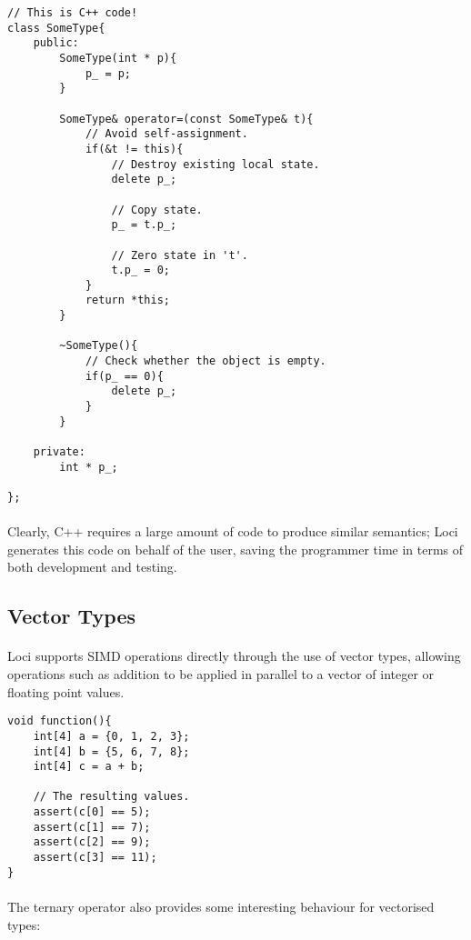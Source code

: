 \documentclass[12pt,twoside,notitlepage]{report}
\begin{document}
\small{
\begin{verbatim}
// This is C++ code!
class SomeType{
    public:
        SomeType(int * p){
            p_ = p;
        }
        
        SomeType& operator=(const SomeType& t){
            // Avoid self-assignment.
            if(&t != this){
                // Destroy existing local state.
                delete p_;
                
                // Copy state.
                p_ = t.p_;
                
                // Zero state in 't'.
                t.p_ = 0;
            }
            return *this;
        }
        
        ~SomeType(){
            // Check whether the object is empty.
            if(p_ == 0){
                delete p_;
            }
        }
    
    private:
        int * p_;
    
};
\end{verbatim}
}

\paragraph{}
Clearly, C++ requires a large amount of code to produce similar semantics; Loci generates this code on behalf of the user, saving the programmer time in terms of both development and testing.

\subsection{Vector Types}

\paragraph{}
Loci supports SIMD operations directly through the use of vector types, allowing operations such as addition to be applied in parallel to a vector of integer or floating point values.

\small{
\begin{verbatim}
void function(){
    int[4] a = {0, 1, 2, 3};
    int[4] b = {5, 6, 7, 8};
    int[4] c = a + b;
    
    // The resulting values.
    assert(c[0] == 5);
    assert(c[1] == 7);
    assert(c[2] == 9);
    assert(c[3] == 11);
}
\end{verbatim}
}

\paragraph{}
The ternary operator also provides some interesting behaviour for vectorised types:
\end{document}
